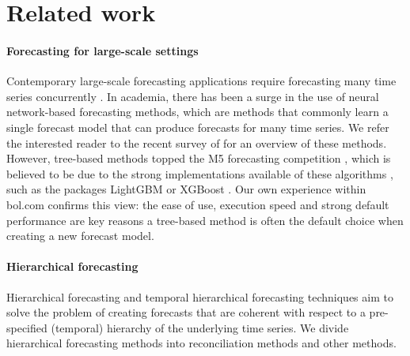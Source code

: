 \documentclass[preprint, 3p, times, twocolumn]{elsarticle}
\begin{document}
\section{Related work} \label{sec:relwork}

\paragraph{Forecasting for large-scale settings} Contemporary large-scale forecasting applications require forecasting many time series concurrently \cite{bose_probabilistic_2017}. In academia, there has been a surge in the use of neural network-based forecasting methods, which are methods that commonly learn a single forecast model that can produce forecasts for many time series. We refer the interested reader to the recent survey of \citet{benidis_deep_2023} for an overview of these methods. However, tree-based methods topped the M5 forecasting competition \cite{makridakis_m5_2022}, which is believed to be due to the strong implementations available of these algorithms \cite{januschowski_forecasting_2022}, such as the packages LightGBM \cite{ke_lightgbm_2017} or XGBoost \cite{chen_xgboost_2016}. Our own experience within bol.com confirms this view: the ease of use, execution speed and strong default performance are key reasons a tree-based method is often the default choice when creating a new forecast model.

\paragraph{Hierarchical forecasting} Hierarchical forecasting \cite{hyndman_optimal_2011, hyndman_fast_2016, taieb_coherent_2017, bentaieb_regularized_2019, wickramasuriya_optimal_2019} and temporal hierarchical forecasting techniques \cite{taieb_sparse_2017,athanasopoulos_forecasting_2017,rangapuram_coherent_2023,theodosiou_forecasting_2021} aim to solve the problem of creating forecasts that are coherent with respect to a pre-specified (temporal) hierarchy of the underlying time series. We divide hierarchical forecasting methods into reconciliation methods and other methods.
\end{document}
